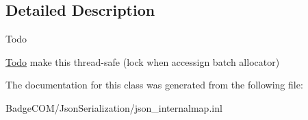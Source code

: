 \subsection{Detailed Description}
\begin{DoxyRefDesc}{Todo}
\item[\hyperlink{todo__todo000002}{Todo}]make this thread-\/safe (lock when accessign batch allocator) \end{DoxyRefDesc}


The documentation for this class was generated from the following file\-:\begin{DoxyCompactItemize}
\item 
Badge\-C\-O\-M/\-Json\-Serialization/json\-\_\-internalmap.\-inl\end{DoxyCompactItemize}
